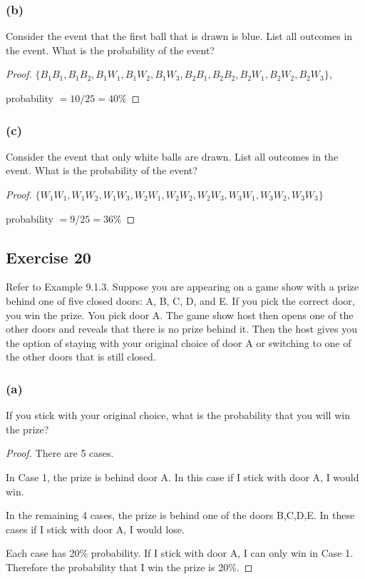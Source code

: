 \documentclass[14pt]{extarticle}
\begin{document}
\subsubsection{(b)}
Consider the event that the first ball that is drawn is blue. List all outcomes in the event. 
What is the probability of the event?

\begin{proof}
\(\{B_1B_1, B_1B_2, B_1W_1, B_1W_2, B_1W_3, B_2B_1, B_2B_2, B_2W_1, B_2W_2, B_2W_3\}\), 

probability \(= 10/25 = 40\%\)
\end{proof}

\subsubsection{(c)}
Consider the event that only white balls are drawn. List all outcomes in the event. 
What is the probability of the event?

\begin{proof}
\(\{W_1W_1, W_1W_2, W_1W_3, W_2W_1, W_2W_2, W_2W_3, W_3W_1, W_3W_2, W_3W_3\}\)

probability \(= 9/25 = 36\%\)
\end{proof}

\subsection{Exercise 20}
Refer to Example 9.1.3. Suppose you are appearing on a game show with a prize behind one of five closed doors: A, B, C, 
D, and E. If you pick the correct door, you win the prize. You pick door A. The game show host then opens one of the 
other doors and reveals that there is no prize behind it. Then the host gives you the option of staying with your 
original choice of door A or switching to one of the other doors that is still closed.

\subsubsection{(a)}
If you stick with your original choice, what is the probability that you will win the prize?

\begin{proof}
There are 5 cases. 

In Case 1, the prize is behind door A. In this case if I stick with door A, I would win.

In the remaining 4 cases, the prize is behind one of the doors B,C,D,E. In these cases if I stick with door A, I 
would lose. 

Each case has 20\% probability. If I stick with door A, I can only win in Case 1. Therefore the probability that I 
win the prize is 20\%.
\end{proof}
\end{document}
